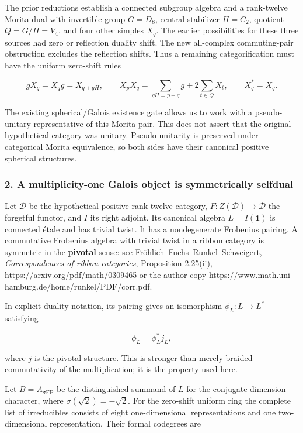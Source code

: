 The prior reductions establish a connected subgroup algebra and a
rank-twelve Morita dual with invertible group \(G=D_8\), central
stabilizer \(H=C_2\), quotient \(Q=G/H=V_4\), and four other simples
\(X_q\). The earlier possibilities for these three sources had zero or
reflection duality shift. The new all-complex commuting-pair obstruction
excludes the reflection shifts. Thus a remaining categorification must
have the uniform zero-shift rules

\[
gX_q=X_qg=X_{q+gH},\qquad
X_pX_q=\sum_{gH=p+q}g+2\sum_{t\in Q}X_t,
\qquad X_q^*=X_q.
\]

The existing spherical/Galois existence gate allows us to work with a
pseudo-unitary representative of this Morita pair. This does not assert
that the original hypothetical category was unitary. Pseudo-unitarity is
preserved under categorical Morita equivalence, so both sides have their
canonical positive spherical structures.

\hypertarget{frontier-a-multiplicity-one-galois-object-is-symmetrically-selfdual}{%
\subsubsection{2. A multiplicity-one Galois object is symmetrically
selfdual}\label{frontier-a-multiplicity-one-galois-object-is-symmetrically-selfdual}}

Let \(\mathcal D\) be the hypothetical positive rank-twelve category,
\(F:Z(\mathcal D)\to\mathcal D\) the forgetful functor, and \(I\) its
right adjoint. Its canonical algebra \(L=I(\mathbf1)\) is connected
étale and has trivial twist. It has a nondegenerate Frobenius pairing. A
commutative Frobenius algebra with trivial twist in a ribbon category is
symmetric in the \textbf{pivotal} sense: see
Fröhlich--Fuchs--Runkel--Schweigert, \emph{Correspondences of ribbon
categories}, Proposition 2.25(ii), https://arxiv.org/pdf/math/0309465 or
the author copy
https://www.math.uni-hamburg.de/home/runkel/PDF/corr.pdf.

In explicit duality notation, its pairing gives an isomorphism
\(\phi_L:L\to L^*\) satisfying

\[
\phi_L=\phi_L^*j_L,
\]

where \(j\) is the pivotal structure. This is stronger than merely
braided commutativity of the multiplication; it is the property used
here.

Let \(B=A_{\sigma\mathrm{FP}}\) be the distinguished summand of \(L\)
for the conjugate dimension character, where \(\sigma(\sqrt2)=-\sqrt2\).
For the zero-shift uniform ring the complete list of irreducibles
consists of eight one-dimensional representations and one
two-dimensional representation. Their formal codegrees are

